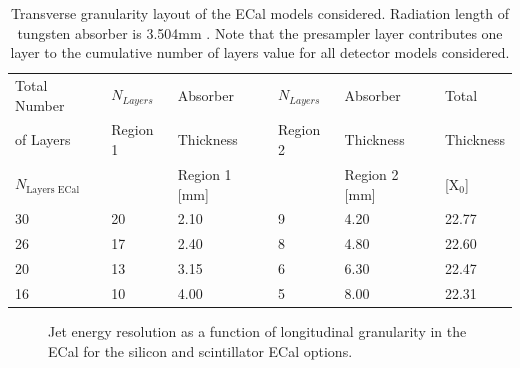 \begin{table}[h!]
\centering
\begin{tabular}{ l l l l l l}
\hline
Total Number & $N_{Layers}$ & Absorber & $N_{Layers}$ & Absorber & Total  \\
of Layers & Region 1 & Thickness & Region 2 & Thickness & Thickness \\
$N_{\text{Layers ECal}}$ & & Region 1 [mm] & &  Region 2 [mm] &  [$\text{X}_{0}$] \\

\hline
30 & 20 & 2.10 & 9 & 4.20 & 22.77 \\
26 & 17 & 2.40 & 8 & 4.80 & 22.60 \\
20 & 13 & 3.15 & 6 & 6.30 & 22.47 \\
16 & 10 & 4.00 & 5 & 8.00 & 22.31\\
\hline
\end{tabular}
\caption[Transverse granularity layout of the ECal models considered.]{Transverse granularity layout of the ECal models considered.  Radiation length of tungsten absorber is 3.504mm \cite{Olive:2016xmw}.  Note that the presampler layer contributes one layer to the cumulative number of layers value for all detector models considered.}
\label{table:nlayersecaloption}
\end{table}

\begin{figure}
\centering
{}
 \hfill
\caption[Jet energy resolution as a function of longitudinal granularity in the ECal.]{Jet energy resolution as a function of longitudinal granularity in the ECal for the silicon and scintillator ECal options.}
\label{fig:ecalnlayers}
\end{figure}


